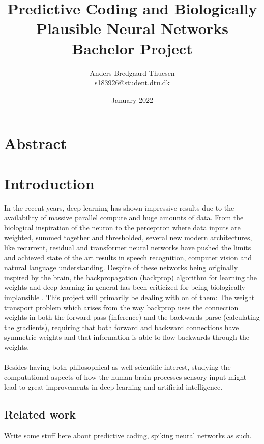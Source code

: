 \documentclass[a4paper,twoside,11pt]{report} %
\title{
  Predictive Coding and Biologically Plausible Neural Networks \\
  \large{Bachelor Project}
}
\author{Anders Bredgaard Thuesen \\ s183926@student.dtu.dk}
\date{January 2022}
\begin{document}
\maketitle

\section*{Abstract}


\newpage

\tableofcontents

\newpage

\section{Introduction}

In the recent years, deep learning has shown impressive results due to the availability of massive parallel compute and huge amounts of data. From the biological inspiration of the neuron to the perceptron where data inputs are weighted, summed together and thresholded, several new modern architectures, like recurrent, residual and transformer neural networks have pushed the limits and achieved state of the art results in speech recognition, computer vision and natural language understanding. Despite of these networks being originally inspired by the brain, the backpropagation (backprop) algorithm for learning the weights and deep learning in general has been criticized for being biologically implausible \cite{BengioLBL15}. This project will primarily be dealing with on of them: The weight transport problem which arises from the way backprop uses the connection weights in both the forward pass (inference) and the backwards parse (calculating the gradients), requiring that both forward and backward connections have symmetric weights and that information is able to flow backwards through the weights. \\
\\
Besides having both philosophical as well scientific interest, studying the computational aspects of how the human brain processes sensory input might lead to great improvements in deep learning and artificial intelligence.
\subsection{Related work}
Write some stuff here about predictive coding, spiking neural networks as such. 
\end{document}
